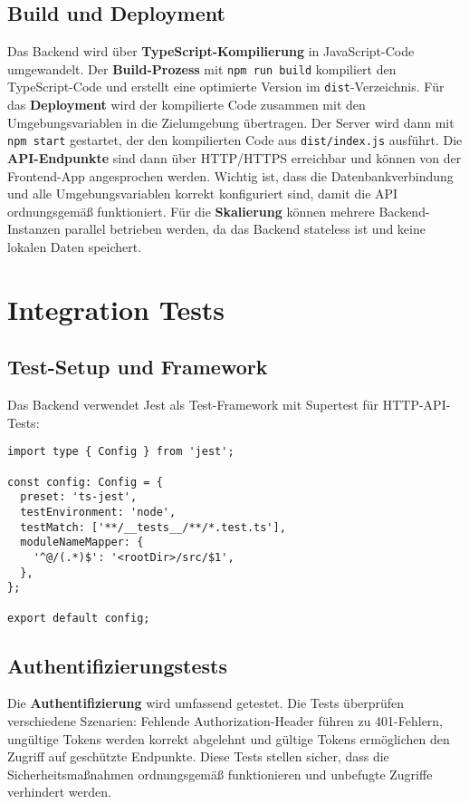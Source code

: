 \subsection{Build und Deployment}

Das Backend wird über \textbf{TypeScript-Kompilierung} in JavaScript-Code umgewandelt. Der \textbf{Build-Prozess} mit \texttt{npm run build} kompiliert den TypeScript-Code und erstellt eine optimierte Version im \texttt{dist}-Verzeichnis. Für das \textbf{Deployment} wird der kompilierte Code zusammen mit den Umgebungsvariablen in die Zielumgebung übertragen. Der Server wird dann mit \texttt{npm start} gestartet, der den kompilierten Code aus \texttt{dist/index.js} ausführt. Die \textbf{API-Endpunkte} sind dann über HTTP/HTTPS erreichbar und können von der Frontend-App angesprochen werden. Wichtig ist, dass die Datenbankverbindung und alle Umgebungsvariablen korrekt konfiguriert sind, damit die API ordnungsgemäß funktioniert. Für die \textbf{Skalierung} können mehrere Backend-Instanzen parallel betrieben werden, da das Backend stateless ist und keine lokalen Daten speichert.



\section{Integration Tests}

\subsection{Test-Setup und Framework}

Das Backend verwendet Jest als Test-Framework mit Supertest für HTTP-API-Tests:

\begin{lstlisting}[style=typescriptstyle,caption={Jest-Konfiguration}]
import type { Config } from 'jest';

const config: Config = {
  preset: 'ts-jest',
  testEnvironment: 'node',
  testMatch: ['**/__tests__/**/*.test.ts'],
  moduleNameMapper: {
    '^@/(.*)$': '<rootDir>/src/$1',
  },
};

export default config;
\end{lstlisting}

\subsection{Authentifizierungstests}

Die \textbf{Authentifizierung} wird umfassend getestet. Die Tests überprüfen verschiedene Szenarien: Fehlende Authorization-Header führen zu 401-Fehlern, ungültige Tokens werden korrekt abgelehnt und gültige Tokens ermöglichen den Zugriff auf geschützte Endpunkte. Diese Tests stellen sicher, dass die Sicherheitsmaßnahmen ordnungsgemäß funktionieren und unbefugte Zugriffe verhindert werden.

